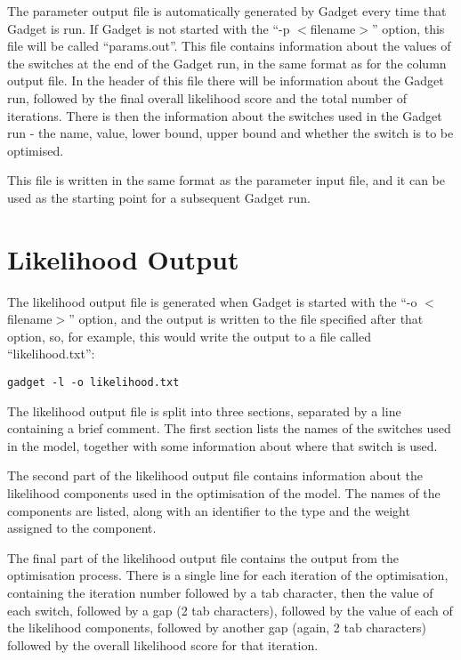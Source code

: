 \documentclass[]{book}
\begin{document}
The parameter output file is automatically generated by Gadget every
time that Gadget is run. If Gadget is not started with the ``-p
\(<\)filename\(>\)'' option, this file will be called ``params.out''. This file
contains information about the values of the switches at the end of the
Gadget run, in the same format as for the column output file. In the
header of this file there will be information about the Gadget run,
followed by the final overall likelihood score and the total number of
iterations. There is then the information about the switches used in the
Gadget run - the name, value, lower bound, upper bound and whether the
switch is to be optimised.

This file is written in the same format as the parameter input file, and
it can be used as the starting point for a subsequent Gadget run.

\hypertarget{sec:likelihoodoutput}{%
\section{Likelihood Output}\label{sec:likelihoodoutput}}

The likelihood output file is generated when Gadget is started with the
``-o \(<\)filename\(>\)'' option, and the output is written to the file
specified after that option, so, for example, this would write the
output to a file called ``likelihood.txt'':

\begin{verbatim}
gadget -l -o likelihood.txt
\end{verbatim}

The likelihood output file is split into three sections, separated by a
line containing a brief comment. The first section lists the names of
the switches used in the model, together with some information about
where that switch is used.

The second part of the likelihood output file contains information about
the likelihood components used in the optimisation of the model. The
names of the components are listed, along with an identifier to the type
and the weight assigned to the component.

The final part of the likelihood output file contains the output from
the optimisation process. There is a single line for each iteration of
the optimisation, containing the iteration number followed by a tab
character, then the value of each switch, followed by a gap (2 tab
characters), followed by the value of each of the likelihood components,
followed by another gap (again, 2 tab characters) followed by the
overall likelihood score for that iteration.
\end{document}
